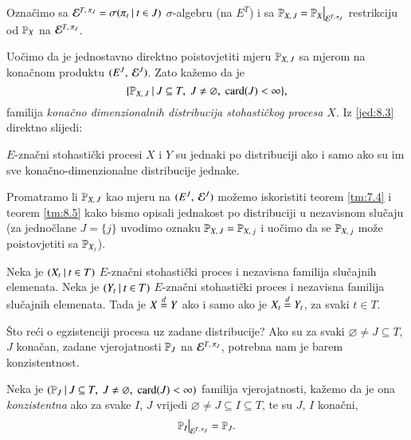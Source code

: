 \begin{defn}
    Ozna\v cimo sa $\mathcal{E}^{T, \: \pi_J} = \sigma({\pi_t} \: | \: {t \in J})$ $\sigma$-algebru (na $E^T$) i sa $\masP_{X, \: J} = \restr{\masP_X}{\famE^{T, \: \pi_J}}$ restrikciju od $\mathbb{P}_X$ na $\mathcal{E}^{T, \: \pi_J}$.
\end{defn}

Uo\v cimo da je jednostavno direktno poistovjetiti mjeru $\mathbb{P}_{X, \: J}$ sa mjerom na kona\v cnom produktu $({E^J}, \: {\mathcal{E}^J})$.
Zato ka\v zemo da je
\begin{equation}    \label{jed:8.4}
    \{{\mathbb{P}_{X, \: J}} \: | \: {J \subseteq T, \; J \neq \varnothing, \; \textnormal{card}({J}) < \infty}\},
\end{equation}
familija \emph{kona\v cno dimenzionalnih distribucija stohasti\v ckog procesa $X$}.
Iz \eqref{jed:8.3} direktno slijedi:

\begin{tm}  \label{tm:8.5}
    $E$-zna\v cni stohasti\v cki procesi $X$ i $Y$ su jednaki po distribuciji ako i samo ako su im sve kona\v cno-dimenzionalne distribucije jednake.
\end{tm}

Promatramo li $\mathbb{P}_{X, \: J}$ kao mjeru na $({E^J}, \: {\mathcal{E}^J})$ mo\v zemo iskoristiti teorem \ref{tm:7.4} i teorem \ref{tm:8.5} kako bismo opisali jednakost po distribuciji u nezavisnom slu\v caju (za jedno\v clane $J = \{j\}$ uvodimo oznaku $\mathbb{P}_{X, \: J} = \mathbb{P}_{X, \: j}$ i uo\v cimo da se $\mathbb{P}_{X, \: j}$ mo\v ze poistovjetiti sa $\mathbb{P}_{X_j}$).

\begin{kor} \label{kor:8.6}
    Neka je $({X_t} \: | \: {t \in T})$ $E$-zna\v cni stohasti\v cki proces i nezavisna familija slu\v cajnih elemenata.
    Neka je $({Y_t} \: | \: {t \in T})$ $E$-zna\v cni stohasti\v cki proces i nezavisna familija slu\v cajnih elemenata.
    Tada je $X \overset{d}{=} Y$ ako i samo ako je $X_t \overset{d}{=} Y_t$, za svaki $t \in T$.
\end{kor}

\v Sto re\' ci o egzistenciji procesa uz zadane distribucije?
Ako su za svaki $\varnothing \neq J \subseteq T$, $J$ kona\v can, zadane vjerojatnosti $\mathbb{P}_J$ na $\mathcal{E}^{T, \: \pi_J}$, potrebna nam je barem konzistentnost.

\begin{defn}    \label{defn:8.6-1}
    Neka je $({\mathbb{P}_J} \: | \: {J \subseteq T, \; J \neq \varnothing, \; \textnormal{card}({J}) < \infty})$ familija vjerojatnosti, ka\v zemo da je ona \emph{konzistentna} ako za svake $I$, $J$ vrijedi $\varnothing \neq J \subseteq  I \subseteq T$, te su $J$, $I$ kona\v cni,
    \begin{equation}    \label{jed:8.7}
        \restr{\masP_I}{\famE^{T, \: \pi_J}} = \masP_J.
    \end{equation}
\end{defn}
 
